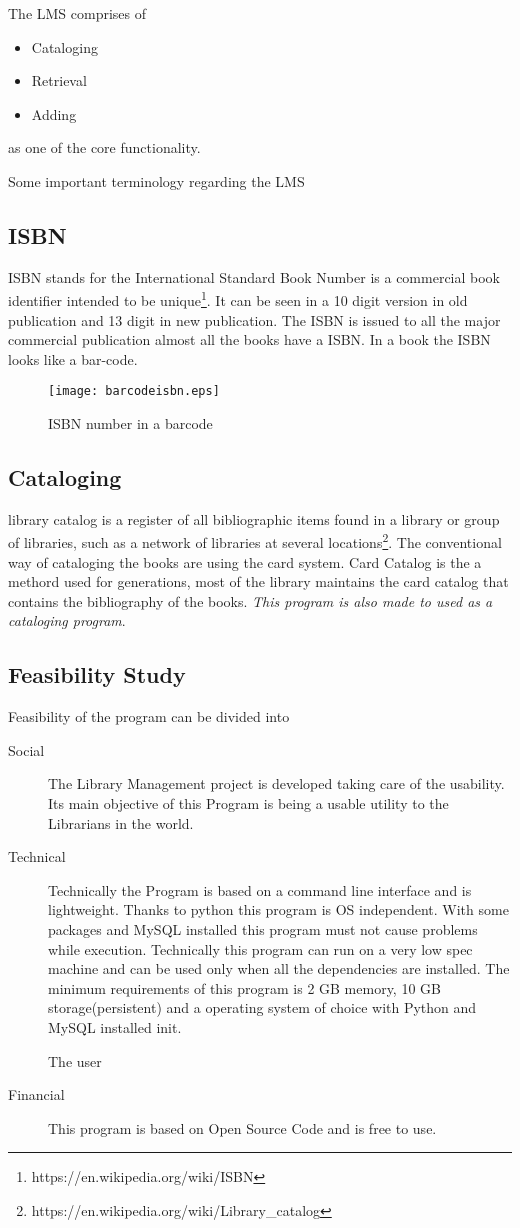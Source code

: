 \documentclass[12pt, a4paper, titlepage, openany]{report}
\begin{document}
The LMS comprises of
\begin{itemize}
\item Cataloging
\item Retrieval
\item Adding
\end{itemize}
as one of the core functionality.

Some important terminology regarding the LMS
\subsection{ISBN}
ISBN stands for the International Standard Book Number is a commercial book identifier intended to be unique\footnote{https://en.wikipedia.org/wiki/ISBN}. It can be seen in a 10 digit version in old publication and 13 digit in new publication. The ISBN is issued to all the major commercial publication almost all the books have a ISBN. In a book the ISBN looks like a bar-code.
\begin{figure}
\centering
\texttt{[image: barcodeisbn.eps]}
\caption{ISBN number in a barcode}
\end{figure}

\subsection{Cataloging}
library catalog is a register of all bibliographic items found in a library or group of libraries, such as a network of libraries at several locations\footnote{https://en.wikipedia.org/wiki/Library\_catalog}. The conventional way of cataloging the books are using the card system. Card Catalog is the a methord used for generations, most of the library maintains the card catalog that contains the bibliography of the books. \emph{This program is also made to used as a cataloging program}.

\subsection{Feasibility Study}
Feasibility of the program can be divided into 
\begin{description}
\item[Social] The Library Management project is developed taking care of the usability. Its main objective of this Program is being a usable utility to the Librarians in the world.
\item[Technical] Technically the Program is based on a command line interface and is lightweight. Thanks to python this program is OS independent. With some packages and MySQL installed this program must not cause problems while execution. Technically this program can run on a very low spec machine and can be used only when all the dependencies are installed. The minimum requirements of this program is 2 GB memory, 10 GB storage(persistent) and a operating system of choice with Python and MySQL installed init. 

The user 
\item[Financial] This program is based on Open Source Code and is free to use.

\end{description} 
\end{document}
